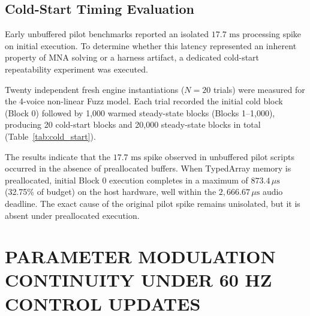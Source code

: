 \documentclass[fleqn,final]{jaes}
\begin{document}
\subsection{Cold-Start Timing Evaluation}
Early unbuffered pilot benchmarks reported an isolated $17.7\text{ ms}$ processing spike on initial execution. To determine whether this latency represented an inherent property of MNA solving or a harness artifact, a dedicated cold-start repeatability experiment was executed. 

Twenty independent fresh engine instantiations ($N=20$ trials) were measured for the 4-voice non-linear Fuzz model. Each trial recorded the initial cold block (Block 0) followed by 1,000 warmed steady-state blocks (Blocks 1--1,000), producing 20 cold-start blocks and 20,000 steady-state blocks in total (Table~\ref{tab:cold_start}).

\begin{table}[h]
\caption{Cold-Start (Block 0) Repeatability Evaluation ($N=20$ Independent Trials, 4-Voice Fuzz).}
\label{tab:cold_start}
\centering
{}
\end{table}

The results indicate that the $17.7\text{ ms}$ spike observed in unbuffered pilot scripts occurred in the absence of preallocated buffers. When TypedArray memory is preallocated, initial Block 0 execution completes in a maximum of $873.4\,\mu\text{s}$ (32.75\% of budget) on the host hardware, well within the $2,666.67\,\mu\text{s}$ audio deadline. The exact cause of the original pilot spike remains unisolated, but it is absent under preallocated execution.

\section{PARAMETER MODULATION CONTINUITY UNDER 60 HZ CONTROL UPDATES}
\end{document}
